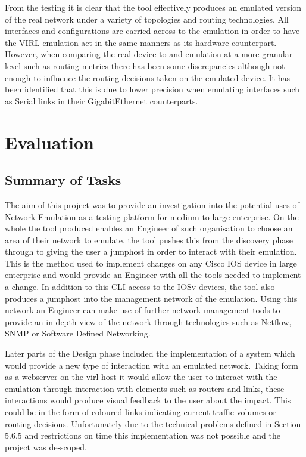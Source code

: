 \documentclass[11pt]{report}
\begin{document}
From the testing it is clear that the tool effectively produces an emulated version of the real network under a variety of topologies and routing technologies. All interfaces and configurations are carried across to the emulation in order to have the VIRL emulation act in the same manners as its hardware counterpart. However, when comparing the real device to and emulation at a more granular level such as routing metrics there has been some discrepancies although not enough to influence the routing decisions taken on the emulated device. It has been identified that this is due to lower precision when emulating interfaces such as Serial links in their GigabitEthernet counterparts.

\chapter{Evaluation}

\section{Summary of Tasks}

The aim of this project was to provide an investigation into the potential uses of Network Emulation as a testing platform for medium to large enterprise. On the whole the tool produced enables an Engineer of such organisation to choose an area of their network to emulate, the tool pushes this from the discovery phase through to giving the user a jumphost in order to interact with their emulation. This is the method used to implement changes on any Cisco IOS device in large enterprise and would provide an Engineer with all the tools needed to implement a change. In addition to this CLI access to the IOSv devices, the tool also produces a jumphost into the management network of the emulation. Using this network an Engineer can make use of further network management tools to provide an in-depth view of the network through technologies such as Netflow, SNMP or Software Defined Networking.

Later parts of the Design phase included the implementation of a system which would provide a new type of interaction with an emulated network. Taking form as a webserver on the virl host it would allow the user to interact with the emulation through interaction with elements such as routers and links, these interactions would produce visual feedback to the user about the impact. This could be in the form of coloured links indicating current traffic volumes or routing decisions. Unfortunately due to the technical problems defined in Section 5.6.5 and restrictions on time this implementation was not possible and the project was de-scoped.
\end{document}
